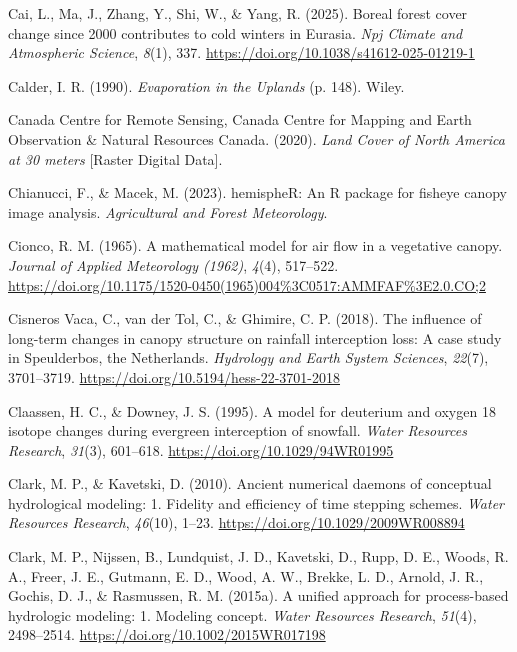 \documentclass[
  letterpaper,
]{tex/uofsthesis-cs}
\newlength{\cslhangindent}
\newenvironment{CSLReferences}[2] %
 {\begin{list}{}{%
  \setlength{\itemindent}{0pt}
  \setlength{\leftmargin}{0pt}
  \setlength{\parsep}{0pt}
  \ifodd #1
   \setlength{\leftmargin}{\cslhangindent}
   \setlength{\itemindent}{-1\cslhangindent}
  \fi
  \setlength{\itemsep}{#2\baselineskip}}}
 {\end{list}}
\begin{document}
\begin{CSLReferences}{1}{0}
Cai, L., Ma, J., Zhang, Y., Shi, W., \& Yang, R. (2025). Boreal forest
cover change since 2000 contributes to cold winters in {Eurasia}.
\emph{Npj Climate and Atmospheric Science}, \emph{8}(1), 337.
\url{https://doi.org/10.1038/s41612-025-01219-1}

Calder, I. R. (1990). \emph{Evaporation in the {Uplands}} (p. 148).
Wiley.

Canada Centre for Remote Sensing, Canada Centre for Mapping and Earth
Observation \& Natural Resources Canada. (2020). \emph{Land {Cover} of
{North America} at 30 meters} {[}Raster Digital Data{]}.

Chianucci, F., \& Macek, M. (2023). {hemispheR}: An {R} package for
fisheye canopy image analysis. \emph{Agricultural and Forest
Meteorology}.

Cionco, R. M. (1965). A mathematical model for air flow in a vegetative
canopy. \emph{Journal of Applied Meteorology (1962)}, \emph{4}(4),
517--522.
\url{https://doi.org/10.1175/1520-0450(1965)004\%3C0517:AMMFAF\%3E2.0.CO;2}

Cisneros Vaca, C., van der Tol, C., \& Ghimire, C. P. (2018). The
influence of long-term changes in canopy structure on rainfall
interception loss: A case study in {Speulderbos}, the {Netherlands}.
\emph{Hydrology and Earth System Sciences}, \emph{22}(7), 3701--3719.
\url{https://doi.org/10.5194/hess-22-3701-2018}

Claassen, H. C., \& Downey, J. S. (1995). A model for deuterium and
oxygen 18 isotope changes during evergreen interception of snowfall.
\emph{Water Resources Research}, \emph{31}(3), 601--618.
\url{https://doi.org/10.1029/94WR01995}

Clark, M. P., \& Kavetski, D. (2010). Ancient numerical daemons of
conceptual hydrological modeling: 1. {Fidelity} and efficiency of time
stepping schemes. \emph{Water Resources Research}, \emph{46}(10), 1--23.
\url{https://doi.org/10.1029/2009WR008894}

Clark, M. P., Nijssen, B., Lundquist, J. D., Kavetski, D., Rupp, D. E.,
Woods, R. A., Freer, J. E., Gutmann, E. D., Wood, A. W., Brekke, L. D.,
Arnold, J. R., Gochis, D. J., \& Rasmussen, R. M. (2015a). A unified
approach for process-based hydrologic modeling: 1. {Modeling} concept.
\emph{Water Resources Research}, \emph{51}(4), 2498--2514.
\url{https://doi.org/10.1002/2015WR017198}


\end{CSLReferences}
\end{document}
